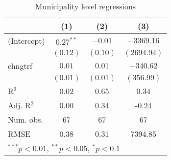 
\begin{table}
\caption{Municipality level regressions}
\begin{center}
\begin{tabular}{l c c c }
\hline
 & (1) & (2) & (3) \\
\hline
(Intercept) & $0.27^{**}$ & $-0.01$  & $-3369.16$  \\
            & $(0.12)$    & $(0.10)$ & $(2694.94)$ \\
chngtrf     & $0.01$      & $0.01$   & $-340.62$   \\
            & $(0.01)$    & $(0.01)$ & $(356.99)$  \\
\hline
R$^2$       & 0.02        & 0.65     & 0.34        \\
Adj. R$^2$  & 0.00        & 0.34     & -0.24       \\
Num. obs.   & 67          & 67       & 67          \\
RMSE        & 0.38        & 0.31     & 7394.85     \\
\hline
\multicolumn{4}{l}{\scriptsize{$^{***}p<0.01$, $^{**}p<0.05$, $^*p<0.1$}}
\end{tabular}
\label{table:coefficients}
\end{center}
\end{table}
